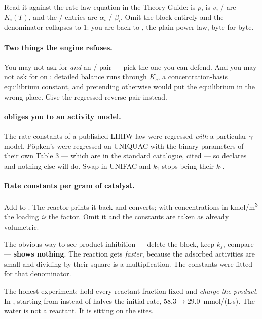\documentclass[11pt,a4paper]{article}
\begin{document}
Read it against the rate-law equation in the Theory Guide:
 is $p$,  is $v$, /
are $K_i(T)$, and the  /  entries are
$\alpha_i$ / $\beta_i$.  Omit the  block entirely and
the denominator collapses to $1$: you are back to ,
the plain power law, byte for byte.

\paragraph{Two things the engine refuses.}  You may not ask for
 \emph{and} an / pair
--- pick the one you can defend.  And you may not ask for
 on : detailed balance runs
through $K_c$, a concentration-basis equilibrium constant, and
pretending otherwise would put the equilibrium in the wrong place.
Give the regressed reverse pair instead.

\paragraph{ obliges you to an activity model.}
The rate constants of a published LHHW law were regressed \emph{with} a
particular $\gamma$-model.  P\"opken's were regressed on UNIQUAC with
the binary parameters of their own Table 3 --- which are in the
standard catalogue, cited --- so 
declares  and nothing else
will do.  Swap in UNIFAC and $k_1$ stops being their $k_1$.

\paragraph{Rate constants per gram of catalyst.}  Add
 to .  The reactor
prints it back and converts; with concentrations in
kmol/m\textsuperscript{3} the loading \emph{is} the factor.  Omit it
and the constants are taken as already volumetric.

\begin{pitfall}
The obvious way to see product inhibition --- delete the
 block, keep $k_f$, compare --- \textbf{shows
nothing}.  The reaction gets \emph{faster}, because the adsorbed
activities are small and dividing by their square is a multiplication.
The constants were fitted for that denominator.

The honest experiment: hold every reactant fraction fixed and
\emph{charge the product}.  In ,
starting from  instead
of  halves the initial rate,
$58.3 \to 29.0$~mmol/(L\,s).  The water is not a reactant.  It is
sitting on the sites.
\end{pitfall}
\end{document}
